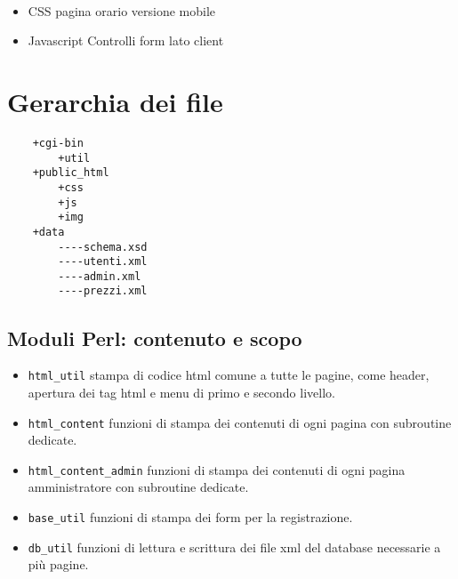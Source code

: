 \documentclass[12pt,a4paper]{article}
\begin{document}
\paragraph{\EC{}}
\begin{itemize}
	\item{CSS}
	\subitem pagina orario versione mobile
	\item{Javascript}
	\subitem Controlli form lato client
\end{itemize}

\section{Gerarchia dei file}

\begin{center}
	\begin{lstlisting}
	+cgi-bin
		+util		
	+public_html
		+css
		+js
		+img
	+data
		----schema.xsd
	    ----utenti.xml
	    ----admin.xml
	    ----prezzi.xml
	\end{lstlisting}
\end{center}
	
	\subsection{Moduli Perl: contenuto e scopo}
	\begin{itemize}
		\item 	\texttt{html\_util} stampa di codice html comune a tutte le pagine, come header, apertura dei tag html e menu di primo e secondo livello. 
		\item 	\texttt{html\_content} funzioni di stampa dei contenuti di ogni pagina con subroutine dedicate. 
		\item 	\texttt{html\_content\_admin} funzioni di stampa dei contenuti di ogni pagina amministratore con subroutine dedicate. 
		\item 	\texttt{base\_util} funzioni di stampa dei form per la registrazione.
		\item 	\texttt{db\_util} funzioni di lettura e scrittura dei file xml del database necessarie a più pagine. 
		
	\end{itemize}
\end{document}
